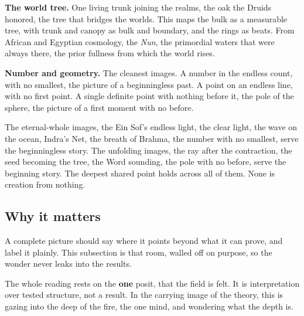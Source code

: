 \textbf{The world tree.} One living trunk joining the realms, the oak the Druids honored, the tree that bridges the worlds. This maps the bulk as a measurable tree, with trunk and canopy as bulk and boundary, and the rings as beats. From African and Egyptian cosmology, the \emph{Nun}, the primordial waters that were always there, the prior fullness from which the world rises.

\textbf{Number and geometry.} The cleanest images. A number in the endless count, with no smallest, the picture of a beginningless past. A point on an endless line, with no first point. A single definite point with nothing before it, the pole of the sphere, the picture of a first moment with no before.

\begin{result}
The eternal-whole images, the Ein Sof's endless light, the clear light, the wave on the ocean, Indra's Net, the breath of Brahma, the number with no smallest, serve the beginningless story. The unfolding images, the ray after the contraction, the seed becoming the tree, the Word sounding, the pole with no before, serve the beginning story. The deepest shared point holds across all of them. None is creation from nothing.
\end{result}

\subsection{Why it matters}

A complete picture should say where it points beyond what it can prove, and label it plainly. This subsection is that room, walled off on purpose, so the wonder never leaks into the results.

The whole reading rests on the \textbf{one} posit, that the field is felt. It is interpretation over tested structure, not a result. In the carrying image of the theory, this is gazing into the deep of the fire, the one mind, and wondering what the depth is.
